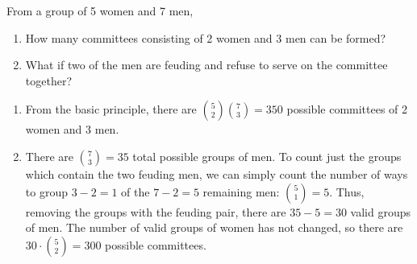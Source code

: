 \begin{changebar}
    \begin{example}
        From a group of 5 women and 7 men, \begin{enumerate}[label=(\alph*)]
            \item How many committees consisting of 2 women and 3 men can be formed?
            \item What if two of the men are feuding and refuse to serve on the committee together?
        \end{enumerate}
    \end{example}
    \begin{solution}\hfill
        \begin{enumerate}[label=(\alph*)]
            \item From the basic principle, there are $\displaystyle {5 \choose 2}{7 \choose 3} = 350$ possible committees of 2 women and 3 men.
            \item There are $\displaystyle {7 \choose 3} = 35$ total possible groups of men. To count just the groups which contain the two feuding men, we can simply count the number of ways to group $3-2 = 1$ of the $7-2 = 5$ remaining men: $\displaystyle {5 \choose 1} = 5$. Thus, removing the groups with the feuding pair, there are $35 - 5 = 30$ valid groups of men. The number of valid groups of women has not changed, so there are $\displaystyle 30\cdot{5 \choose 2} = 300$ possible committees.
        \end{enumerate}
    \end{solution}
\end{changebar}

